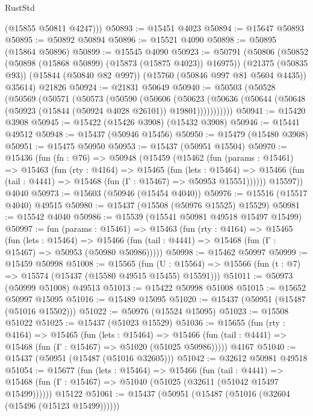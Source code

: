 \begin{lexlean}{RustStd}
\begin{coremodule}
        (@15855 @50811 @4247)))
@50893 := @15451 @4023
@50894 := @15647 @50893
@50895 := @50892 @50894
@50896 := @15521 @4090
@50898 := @50895 (@15864 @50896)
@50899 := @15545 @4090
@50923 := @50791
    (@50806
      (@50852 (@50898 (@15868 @50899) (@15873 (@15875 @4023)) @16975))
      (@21375 (@50835 @93))
      (@15844 (@50840 @82 @997))
      (@15760 (@50846 @997 @81 @5604 @4435))
      @35614)
    @21826
@50924 := @21831 @50649
@50940 := @50503
    (@50528
      (@50569
        (@50571
          (@50573
            (@50590
              (@50606
                (@50623
                  (@50636 (@50644 (@50648 (@50923 (@15844 (@50924 @4028 @26101)) @19801)))))))))))
@50941 := @15420 @3908
@50945 := @15422 (@15426 @3908) (@15432 @3908)
@50946 := @15441 @49512
@50948 := @15437 (@50946 @15456)
@50950 := @15479 (@15480 @3908)
@50951 := @15475 @50950
@50953 := @15437 (@50951 @15504)
@50970 := @15436
    (fun (fn : @76) =>
    @50948
      (@15459
        (@15462
          (fun (params : @15461) =>
          @15463
            (fun (rty : @4164) =>
            @15465
              (fun (lets : @15464) =>
              @15466 (fun (tail : @4441) => @15468 (fun (Γ : @15467) => @50953 @15551))))))
        @15597))
    @4040
@50973 := @15603 (@50946 (@15454 @4040))
@50976 := @15516 (@15517 @4040) @49515
@50980 := @15437 (@15508 (@50976 @15525) @15529)
@50981 := @15542 @4040
@50986 := @15539 (@15541 @50981 @49518 @15497 @15499)
@50997 := fun (params : @15461) =>
  @15463
    (fun (rty : @4164) =>
    @15465
      (fun (lets : @15464) =>
      @15466 (fun (tail : @4441) => @15468 (fun (Γ : @15467) => @50953 (@50980 @50986)))))
@50998 := @15462 @50997
@50999 := @15459 @50998
@51008 := @15565
    (fun (U : @15564) => @15566 (fun (t : @7) => @15574 (@15437 (@15580 @49515 @15455) @15591)))
@51011 := @50973 (@50999 @51008) @49513
@51013 := @15422 @50998 @51008
@51015 := @15652 @50997 @15095
@51016 := @15489 @15095
@51020 := @15437 (@50951 (@15487 (@51016 @15502)))
@51022 := @50976 (@15524 @15095)
@51023 := @15508 @51022
@51025 := @15437 (@51023 @15529)
@51036 := @15655
    (fun (rty : @4164) =>
    @15465
      (fun (lets : @15464) =>
      @15466 (fun (tail : @4441) => @15468 (fun (Γ : @15467) => @51020 (@51025 @50986)))))
    @4167
@51040 := @15437 (@50951 (@15487 (@51016 @32605)))
@51042 := @32612 @50981 @49518
@51054 := @15677
    (fun (lets : @15464) =>
    @15466
      (fun (tail : @4441) =>
      @15468 (fun (Γ : @15467) => @51040 (@51025 (@32611 (@51042 @15497 @15499))))))
    @15122
@51061 := @15437 (@50951 (@15487 (@51016 (@32604 (@15496 (@15123 @15499))))))

\end{coremodule}
\end{lexlean}
